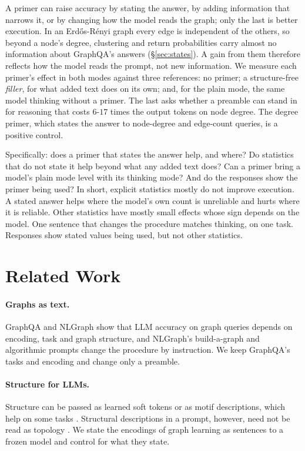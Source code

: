 \documentclass[11pt]{article}
\begin{document}
A primer can raise accuracy by stating the answer, by adding information that narrows it, or by changing how the model reads the graph; only the last is better execution. In an Erd\H{o}s-R\'enyi graph every edge is independent of the others, so beyond a node's degree, clustering and return probabilities carry almost no information about GraphQA's answers (\S\ref{sec:states}). A gain from them therefore reflects how the model reads the prompt, not new information. We measure each primer's effect in both modes against three references: no primer; a structure-free \emph{filler}, for what added text does on its own; and, for the plain mode, the same model thinking without a primer. The last asks whether a preamble can stand in for reasoning that costs $6$-$17$ times the output tokens on node degree. The degree primer, which states the answer to node-degree and edge-count queries, is a positive control. %

Specifically: does a primer that states the answer help, and where? Do statistics that do not state it help beyond what any added text does? Can a primer bring a model's plain mode level with its thinking mode? And do the responses show the primer being used? In short, explicit statistics mostly do not improve execution. A stated answer helps where the model's own count is unreliable and hurts where it is reliable. Other statistics have mostly small effects whose sign depends on the model. One sentence that changes the procedure matches thinking, on one task. Responses show stated values being used, but not other statistics.

\section{Related Work}
\label{sec:related}
\paragraph{Graphs as text.} GraphQA \citep{fatemi2023talklikeagraph} and NLGraph \citep{wang2023nlgraph} show that LLM accuracy on graph queries depends on encoding, task and graph structure, and NLGraph's build-a-graph and algorithmic prompts change the procedure by instruction. We keep GraphQA's tasks and encoding and change only a preamble.

\paragraph{Structure for LLMs.} Structure can be passed as learned soft tokens \citep{perozzi2024letyourgraph} or as motif descriptions, which help on some tasks \citep{das2024modality}. Structural descriptions in a prompt, however, need not be read as topology \citep{huang2024can}. We state the encodings of graph learning as sentences to a frozen model and control for what they state.
\end{document}
